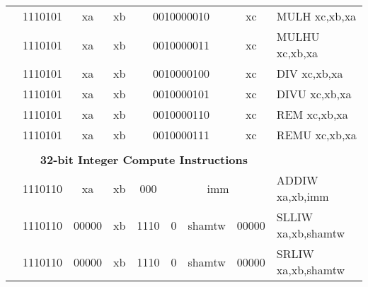 \begin{table}[p]
\begin{small}
\begin{center}
\begin{tabular}{rcccccccccl}
&
\multicolumn{2}{|c|}{1110101} &
\multicolumn{1}{c|}{xa} &
\multicolumn{1}{c|}{xb} &
\multicolumn{4}{c|}{0010000010} &
\multicolumn{1}{c|}{xc} & MULH xc,xb,xa \\
\cline{2-10}
  

&
\multicolumn{2}{|c|}{1110101} &
\multicolumn{1}{c|}{xa} &
\multicolumn{1}{c|}{xb} &
\multicolumn{4}{c|}{0010000011} &
\multicolumn{1}{c|}{xc} & MULHU xc,xb,xa \\
\cline{2-10}
  

&
\multicolumn{2}{|c|}{1110101} &
\multicolumn{1}{c|}{xa} &
\multicolumn{1}{c|}{xb} &
\multicolumn{4}{c|}{0010000100} &
\multicolumn{1}{c|}{xc} & DIV xc,xb,xa \\
\cline{2-10}
  

&
\multicolumn{2}{|c|}{1110101} &
\multicolumn{1}{c|}{xa} &
\multicolumn{1}{c|}{xb} &
\multicolumn{4}{c|}{0010000101} &
\multicolumn{1}{c|}{xc} & DIVU xc,xb,xa \\
\cline{2-10}
  

&
\multicolumn{2}{|c|}{1110101} &
\multicolumn{1}{c|}{xa} &
\multicolumn{1}{c|}{xb} &
\multicolumn{4}{c|}{0010000110} &
\multicolumn{1}{c|}{xc} & REM xc,xb,xa \\
\cline{2-10}
  

&
\multicolumn{2}{|c|}{1110101} &
\multicolumn{1}{c|}{xa} &
\multicolumn{1}{c|}{xb} &
\multicolumn{4}{c|}{0010000111} &
\multicolumn{1}{c|}{xc} & REMU xc,xb,xa \\
\cline{2-10}
  

&
\multicolumn{9}{c}{} & \\
&
\multicolumn{9}{c}{\bf 32-bit Integer Compute Instructions} & \\
\cline{2-10}
  

&
\multicolumn{2}{|c|}{1110110} &
\multicolumn{1}{c|}{xa} &
\multicolumn{1}{c|}{xb} &
\multicolumn{1}{c|}{000} &
\multicolumn{4}{c|}{imm} & ADDIW xa,xb,imm \\
\cline{2-10}
  

&
\multicolumn{2}{|c|}{1110110} &
\multicolumn{1}{c|}{00000} &
\multicolumn{1}{c|}{xb} &
\multicolumn{2}{c|}{1110} &
\multicolumn{1}{c|}{0} &
\multicolumn{1}{c|}{shamtw} &
\multicolumn{1}{c|}{00000} & SLLIW xa,xb,shamtw \\
\cline{2-10}
  

&
\multicolumn{2}{|c|}{1110110} &
\multicolumn{1}{c|}{00000} &
\multicolumn{1}{c|}{xb} &
\multicolumn{2}{c|}{1110} &
\multicolumn{1}{c|}{0} &
\multicolumn{1}{c|}{shamtw} &
\multicolumn{1}{c|}{00000} & SRLIW xa,xb,shamtw \\
\cline{2-10}
  


\end{tabular}
\end{center}
\end{small}
\end{table}
